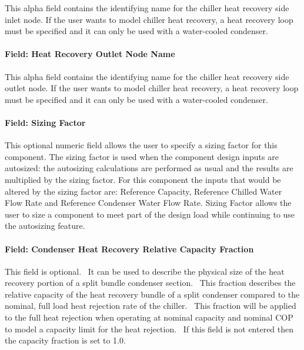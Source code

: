 This alpha field contains the identifying name for the chiller heat recovery side inlet node. If the user wants to model chiller heat recovery, a heat recovery loop must be specified and it can only be used with a water-cooled condenser.

\paragraph{Field: Heat Recovery Outlet Node Name}\label{field-heat-recovery-outlet-node-name-2}

This alpha field contains the identifying name for the chiller heat recovery side outlet node. If the user wants to model chiller heat recovery, a heat recovery loop must be specified and it can only be used with a water-cooled condenser.

\paragraph{Field: Sizing Factor}\label{field-sizing-factor-5}

This optional numeric field allows the user to specify a sizing factor for this component. The sizing factor is used when the component design inputs are autosized: the autosizing calculations are performed as usual and the results are multiplied by the sizing factor. For this component the inputs that would be altered by the sizing factor are: Reference Capacity, Reference Chilled Water Flow Rate and Reference Condenser Water Flow Rate. Sizing Factor allows the user to size a component to meet part of the design load while continuing to use the autosizing feature.

\paragraph{Field: Condenser Heat Recovery Relative Capacity Fraction}\label{field-condenser-heat-recovery-relative-capacity-fraction-2}

This field is optional.~ It can be used to describe the physical size of the heat recovery portion of a split bundle condenser section.~ This fraction describes the relative capacity of the heat recovery bundle of a split condenser compared to the nominal, full load heat rejection rate of the chiller.~ This fraction will be applied to the full heat rejection when operating at nominal capacity and nominal COP to model a capacity limit for the heat rejection.~ If this field is not entered then the capacity fraction is set to 1.0.

